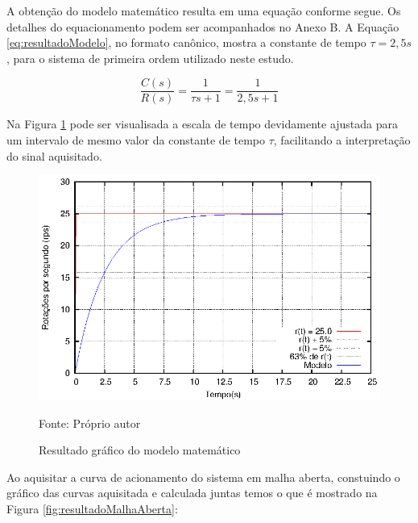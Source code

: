 A obtenção do modelo matemático resulta em uma equação conforme segue.
Os detalhes do equacionamento podem ser acompanhados no Anexo B.
A Equação \ref{eq:resultadoModelo}, no formato canônico,  mostra a constante de tempo $\tau
= 2,5s$, para o sistema de primeira ordem utilizado neste estudo.  

\begin{equation}
  \frac{C(s)}{R(s)} = \frac{1}{\tau s+1} = \frac{1}{2,5 s+1}
\label{eq:resultadoModelo}
\end{equation}

Na Figura \ref{fig:resultadoft} pode ser visualisada a 
escala de tempo devidamente ajustada para um intervalo de mesmo
valor da constante de tempo $\tau$, facilitando a interpretação do
sinal aquisitado.

\begin{figure}[!htb]
\centering
\caption{Resultado gráfico do modelo matemático}
\center\includegraphics[scale=1.3]{./imagens/ft.eps}

\label{fig:resultadoft}

{\small Fonte: Próprio autor}
\end{figure}



Ao aquisitar a curva de acionamento do sistema em malha aberta,
constuindo o gráfico das curvas aquisitada e calculada juntas  temos o
que é mostrado na Figura \ref{fig:resultadoMalhaAberta}:


